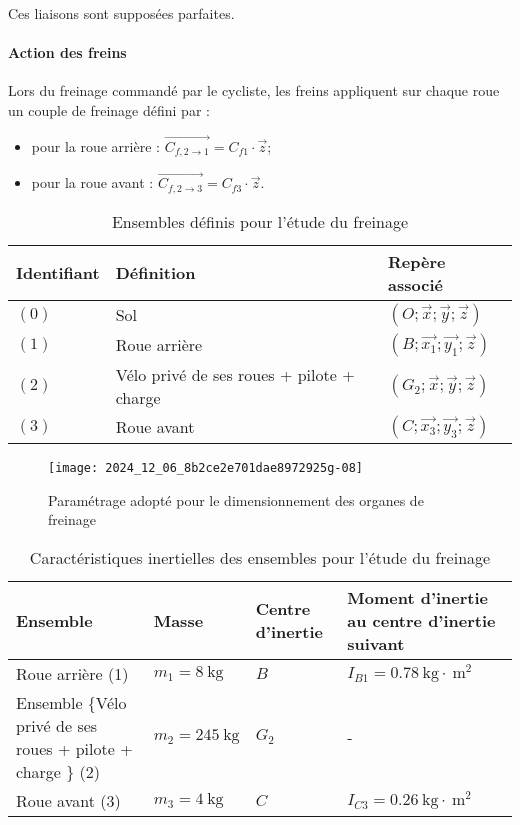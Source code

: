 Ces liaisons sont supposées parfaites.

\paragraph*{Action des freins} Lors du freinage commandé par le cycliste, les freins appliquent sur chaque roue un couple de freinage défini par :
\begin{itemize}
\item pour la roue arrière : \(\overrightarrow{C_{f, 2 \rightarrow 1}}=C_{f 1} \cdot \vec{z}\);
\item pour la roue avant : \(\overrightarrow{C_{f, 2 \rightarrow 3}}=C_{f 3} \cdot \vec{z}\).
\end{itemize}


\begin{table}[!h]
\centering
\begin{tabular}{lll}
\hline
\textbf{Identifiant} & \textbf{Définition} & \textbf{Repère associé} \\
\hline
\((0)\) & Sol & \((O ; \vec{x} ; \vec{y} ; \vec{z})\) \\
\((1)\) & Roue arrière & \(\left(B ; \overrightarrow{x_{1}} ; \overrightarrow{y_{1}} ; \vec{z}\right)\) \\
\((2)\) & Vélo privé de ses roues + pilote + charge & \(\left(G_{2} ; \vec{x} ; \vec{y} ; \vec{z}\right)\) \\
\((3)\) & Roue avant & \(\left(C ; \overrightarrow{x_{3}} ; \overrightarrow{y_{3}} ; \vec{z}\right)\) \\
\hline
\end{tabular}
\caption{Ensembles définis pour l'étude du freinage \label{tab_31}}
\end{table}




\begin{figure}[!htb]
\begin{center}
\texttt{[image: 2024\_12\_06\_8b2ce2e701dae8972925g-08]}
\caption{Paramétrage adopté pour le dimensionnement des organes de freinage \label{fig_32}}
\end{center}
\end{figure}


\begin{table}[!h]
\centering
\begin{tabular}{p{4cm}p{3cm}p{3cm}p{4cm}}
\hline
\textbf{Ensemble} & \textbf{Masse} & \textbf{Centre d'inertie}&\textbf{Moment d'inertie au centre d'inertie suivant } \\
\hline
Roue arrière (1) & \(m_{1}=8 \mathrm{~kg}\) & \(B\) & \(I_{B 1}=0.78 \mathrm{~kg} \cdot \mathrm{~m}^{2}\) \\
Ensemble \{Vélo privé de ses roues + pilote + charge \} (2)  & \(m_{2}=245 \mathrm{~kg}\) & \(G_{2}\) & - \\
Roue avant (3) & \(m_{3}=4 \mathrm{~kg}\) & \(C\) & \(I_{C 3}=0.26 \mathrm{~kg} \cdot \mathrm{~m}^{2}\) \\
\hline
\end{tabular}
\caption{ Caractéristiques inertielles des ensembles pour l'étude du freinage \label{tab_32}}
\end{table}


